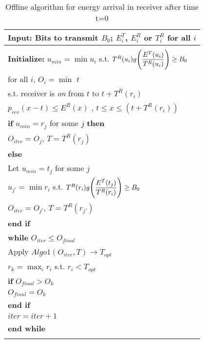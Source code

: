 \begin{table}
\begin{minipage}[b]{8cm}
\caption {Offline algorithm for energy arrival in receiver after time t=0}
\begin{tabular}{p{7cm}}
\hline \textbf{Input}: Bits to transmit $B_0$; $E^T_i$, $E^R_i$ or $T^R_i$ for all $i$
\\
\hline
\\
\textbf{Initialize:} 
$u_{min}=\min u_i$ s.t. $T^R(u_i)g\Bigg{(} \dfrac{E^T(u_i)}{T^R(u_i)}\Bigg{)}\ge B_0$
\\
for all $i$, $O_i=\min$ $t$
\\ 
s.t. receiver is \textit{on} from $t$ to $t+T^R(r_i)$ 
\\
\hspace{4mm}$p_{rcv}(x-t) \le E^R(x)$ ,  $t \le x\le (t+T^R(r_i))$ 
\\
\textbf{if} $u_{min}=r_j$ for some $j$  \textbf{then}
\\
\hspace{4mm}$O_{iter}=O_{j}$, $T=T^R(r_j)$
\\
\textbf{else}
\\
\hspace{4mm}Let $u_{min}=t_j$ for some $j$
\\
\hspace{4mm}$u_{j'}=\min r_i$ s.t. $T^R(r_i)g\Bigg{(} \dfrac{E^T(t_j)}{T^R(r_i)}\Bigg{)}\ge B_0$
\\
\hspace{4mm}$O_{iter}=O_{j'}$, $T=T^R(r_{j'})$
\\
\textbf{end if}
\\
\textbf{while} $O_{iter}\le O_{final}$
\\
\hspace{4mm}Apply $Algo1(O_{iter} ,T)\rightarrow T_{opt}$
\\
\hspace{4mm}$r_k=\max_i r_i $ s.t. $r_i<T_{opt}$ 
\\
\hspace{4mm}\textbf{if} $O_{final} > O_{k}$
\\
\hspace{7mm}$O_{final} = O_{k}$
\\
\hspace{4mm}\textbf{end if}
\\
\hspace{4mm}$iter=iter+1$
\\
\textbf{end while}
\\
\hline
\label{online}
\end{tabular}
\end{minipage}
\end{table}